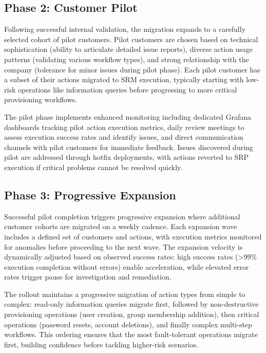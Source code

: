 \subsection{Phase 2: Customer Pilot}

Following successful internal validation, the migration expands to a carefully selected cohort of pilot customers. Pilot customers are chosen based on technical sophistication (ability to articulate detailed issue reports), diverse action usage patterns (validating various workflow types), and strong relationship with the company (tolerance for minor issues during pilot phase). Each pilot customer has a subset of their actions migrated to SRM execution, typically starting with low-risk operations like information queries before progressing to more critical provisioning workflows.

The pilot phase implements enhanced monitoring including dedicated Grafana dashboards tracking pilot action execution metrics, daily review meetings to assess execution success rates and identify issues, and direct communication channels with pilot customers for immediate feedback. Issues discovered during pilot are addressed through hotfix deployments, with actions reverted to SRP execution if critical problems cannot be resolved quickly.

\subsection{Phase 3: Progressive Expansion}

Successful pilot completion triggers progressive expansion where additional customer cohorts are migrated on a weekly cadence. Each expansion wave includes a defined set of customers and actions, with execution metrics monitored for anomalies before proceeding to the next wave. The expansion velocity is dynamically adjusted based on observed success rates: high success rates (>99\% execution completion without errors) enable acceleration, while elevated error rates trigger pause for investigation and remediation.

The rollout maintains a progressive migration of action types from simple to complex: read-only information queries migrate first, followed by non-destructive provisioning operations (user creation, group membership addition), then critical operations (password resets, account deletions), and finally complex multi-step workflows. This ordering ensures that the most fault-tolerant operations migrate first, building confidence before tackling higher-risk scenarios.

